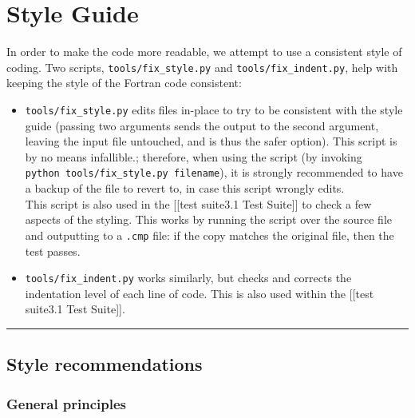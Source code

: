 \section{Style Guide} \label{sec:style}

In order to make the code more readable, we attempt to use a consistent
style of coding. Two scripts, \texttt{tools/fix\_style.py} and
\texttt{tools/fix\_indent.py}, help with keeping the style of the
Fortran code consistent:

\begin{itemize}
\item
  \texttt{tools/fix\_style.py} edits files in-place to try to be
  consistent with the style guide (passing two arguments sends the
  output to the second argument, leaving the input file untouched, and
  is thus the safer option). This script is by no means infallible.;
  therefore, when using the script (by invoking
  \texttt{python\ tools/fix\_style.py\ filename}), it is strongly
  recommended to have a backup of the file to revert to, in case this
  script wrongly edits.\\
  This script is also used in the {[}{[}test suite\textbar{}3.1 Test
  Suite{]}{]} to check a few aspects of the styling. This works by
  running the script over the source file and outputting to a
  \texttt{.cmp} file: if the copy matches the original file, then the
  test passes.
\item
  \texttt{tools/fix\_indent.py} works similarly, but checks and corrects
  the indentation level of each line of code. This is also used within
  the {[}{[}test suite\textbar{}3.1 Test Suite{]}{]}.
\end{itemize}

\begin{center}\rule{0.5\linewidth}{\linethickness}\end{center}

\hypertarget{style-recommendations}{%
\subsection{Style recommendations}\label{style-recommendations}}

\hypertarget{general-principles}{%
\subsubsection{General principles}\label{general-principles}}

